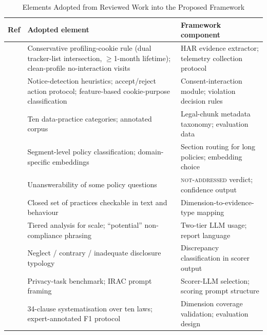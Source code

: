 \documentclass[conference]{IEEEtran}
\begin{document}
\begin{table}[!t]
\centering
\caption{Elements Adopted from Reviewed Work into the Proposed Framework}
\label{tab:adopted}
\footnotesize
\begin{tabular}{P{0.5cm} P{3.6cm} P{3.1cm}}
\toprule
\textbf{Ref} & \textbf{Adopted element} & \textbf{Framework component} \\
\midrule
\cite{trevisan-2019-cookielaw} & Conservative profiling-cookie rule (dual tracker-list intersection, $\geq$1-month lifetime); clean-profile no-interaction visits & HAR evidence extractor; telemetry collection protocol \\
\addlinespace
\cite{bouhoula-2024-cookies} & Notice-detection heuristics; accept/reject action protocol; feature-based cookie-purpose classification & Consent-interaction module; violation decision rules \\
\addlinespace
\cite{wilson-2016-opp115} & Ten data-practice categories; annotated corpus & Legal-chunk metadata taxonomy; evaluation data \\
\addlinespace
\cite{harkous-2018-polisis} & Segment-level policy classification; domain-specific embeddings & Section routing for long policies; embedding choice \\
\addlinespace
\cite{ravichander-2019-privacyqa} & Unanswerability of some policy questions & \textsc{not-addressed} verdict; confidence output \\
\addlinespace
\cite{zimmeck-2017-mobileapps} & Closed set of practices checkable in text and behaviour & Dimension-to-evidence-type mapping \\
\addlinespace
\cite{zimmeck-2019-maps} & Tiered analysis for scale; ``potential'' non-compliance phrasing & Two-tier LLM usage; report language \\
\addlinespace
\cite{xiao-2023-lalaine} & Neglect / contrary / inadequate disclosure typology & Discrepancy classification in scorer output \\
\addlinespace
\cite{guha-2023-legalbench} & Privacy-task benchmark; IRAC prompt framing & Scorer-LLM selection; scoring prompt structure \\
\addlinespace
\cite{xie-2025-llmpolicy} & 34-clause systematisation over ten laws; expert-annotated F1 protocol & Dimension coverage validation; evaluation design \\
\bottomrule
\end{tabular}
\end{table}

\end{document}
